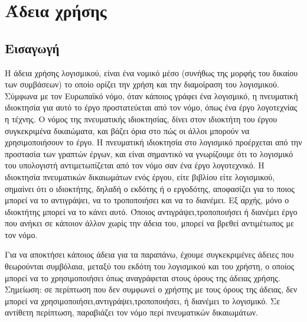 %
%
%
%
%
\section{Άδεια χρήσης}
\subsection{Εισαγωγή}
Η άδεια χρήσης λογισμικού, είναι ένα νομικό μέσο (συνήθως της μορφής του δικαίου των συμβάσεων) το οποίο ορίζει την χρήση και την διαμοίραση του λογισμικού. Σύμφωνα με τον Ευρωπαϊκό νόμο, όταν κάποιος γράφει ένα λογισμικό, η πνευματική ιδιοκτησία για αυτό το έργο προστατεύεται από τον νόμο, όπως ένα έργο λογοτεχνίας η τέχνης. Ο νόμος της πνευματικής ιδιοκτησίας, δίνει στον ιδιοκτήτη του έργου συγκεκριμένα δικαιώματα, και βάζει όρια στο πώς οι άλλοι μπορούν να χρησιμοποιήσουν το έργο. Η πνευματική ιδιοκτησία στο λογισμικό προέρχεται από την προστασία των γραπτών έργων, και είναι σημαντικό να γνωρίζουμε ότι το λογισμικό του υπολογιστή αντιμετωπίζεται από τον νόμο σαν ένα έργο λογοτεχνικό. Η ιδιοκτησία πνευματικών δικαιωμάτων ενός έργου, είτε βιβλίου είτε λογισμικού, σημαίνει ότι ο ιδιοκτήτης, δηλαδή ο εκδότης ή ο εργοδότης, αποφασίζει για το ποιος μπορεί να το αντιγράψει, να το τροποποιήσει και να το διανέμει. Εξ αρχής, μόνο ο ιδιοκτήτης μπορεί να το κάνει αυτό.\cite{license-2} Όποιος αντιγράψει,τροποποιήσει ή διανέμει έργο που ανήκει σε κάποιον άλλον χωρίς την άδεια του, μπορεί να βρεθεί αντιμέτωπος με τον νόμο.

Για να αποκτήσει κάποιος άδεια για τα παραπάνω, έχουμε συγκεκριμένες άδειες που θεωρούνται συμβόλαια, μεταξύ του εκδότη του λογισμικού και του χρήστη, ο οποίος μπορεί να το χρησιμοποιήσει όπως αναγράφεται στους όρους της άδειας χρήσης. Σημείωση: σε περίπτωση που δεν συμφωνεί ο χρήστης με τους όρους της άδειας, δεν μπορεί να χρησιμοποιήσει,αντιγράψει,τροποποιήσει, ή διανέμει το λογισμικό. Σε αντίθετη περίπτωση, παραβιάζει τον νόμο περί πνευματικών δικαιωμάτων. 

